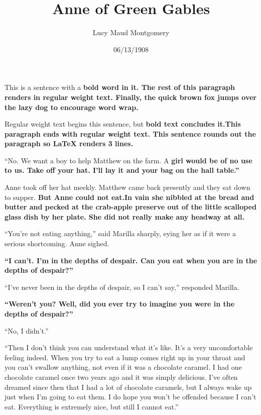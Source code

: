 \documentclass[a4paper]{article}
\title{Anne of Green Gables}
\author{Lucy Maud Montgomery}
\date{06/13/1908}
\begin{document}
\maketitle

This is a sentence with a \bfseries bold \mdseries word in it. The rest of this paragraph renders in regular weight text. Finally, the quick brown fox jumps over the lazy dog to encourage word wrap.

Regular weight text begins this sentence, but \bfseries bold text concludes it.\mdseries This paragraph ends with regular weight text. This sentence rounds out the paragraph so LaTeX renders 3 lines.



``No. We want a boy to help Matthew on the farm. A \bfseries girl \mdseries would be of no use to us. Take off your hat. I'll lay it and your bag on the hall table.''

Anne took off her hat meekly. Matthew came back presently and they sat down to supper. \bfseries But Anne could not eat.\mdseries In vain she nibbled at the bread and butter and pecked at the crab-apple preserve out of the little scalloped glass dish by her plate. She did not really make any headway at all.

``You're not eating anything,'' said Marilla sharply, eying her as if it were a serious shortcoming. Anne sighed.

\bfseries``I can't. I'm in the depths of despair. Can you eat when you are in the depths of despair?''\mdseries

``I've never been in the depths of despair, so I can't say,'' responded Marilla.

\bfseries``Weren't you? Well, did you ever try to imagine you were in the depths of despair?''

``No, I didn't.''\mdseries

``Then I don't think you can understand what it's like. It's a very uncomfortable feeling indeed. When you try to eat a lump comes right up in your throat and you can't swallow anything, not even if it was a chocolate caramel. I had one chocolate caramel once two years ago and it was simply delicious. I've often dreamed since then that I had a lot of chocolate caramels, but I always wake up just when I'm going to eat them. I do hope you won't be offended because I can't eat. Everything is extremely nice, but still I cannot eat.''
\end{document}
